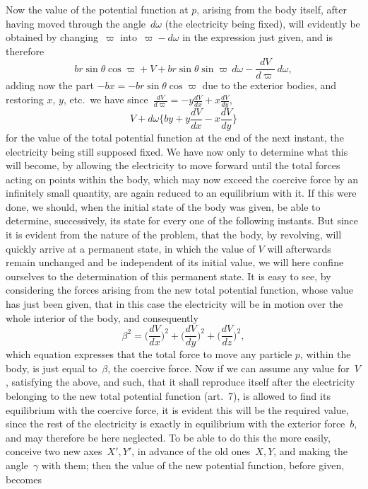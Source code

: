 \documentclass[11pt,notitlepage]{amsart}
\begin{document}
Now the value of the potential function at $p$, arising from the body
itself, after having moved through the angle~$d\omega$
(the electricity being fixed),
will evidently be obtained by changing~$\varpi$
into~$\varpi-d\omega$ in the expression just
given, and is therefore
\[
br\sin\theta\cos\varpi+V+br\sin\theta\sin\varpi\,d\omega
-\frac{dV}{d\varpi}\,d\omega,
\]
adding now the part $-bx=-br\sin\theta\cos\varpi$
due to the exterior bodies, and
restoring $x$, $y$, etc.\ we have
since~$\frac{dV}{d\varpi}=-y\frac{dV}{dx}+x\frac{dV}{dy}$,
\[
V+d\omega\biggl\{
  by+y\frac{dV}{dx}-x\frac{dV}{dy}
\biggr\}
\]
for the value of the total potential function at the end of the next instant,
the electricity being still supposed fixed. We have now only to determine
what this will become, by allowing the electricity to move forward until the
total forces acting on points within the body, which may now exceed the
coercive force by an infinitely small quantity, are again reduced to an 
equilibrium with it. If this were done, we should, when the initial state of the
body was given, be able to determine, successively, its state for every one of
the following instants. But since it is evident from the nature of the problem,
that the body, by revolving, will quickly arrive at a permanent state, in
which the value of $V$ will afterwards remain unchanged and be independent
of its initial value,
we will here confine ourselves to the determination of this
permanent state. It is easy to see, by considering the forces arising from
the new total potential function, whose value has just been given, that in this
case the electricity will be in motion over the whole interior of the body, and
consequently
\[
\beta^2=
\biggl(\frac{dV}{dx}\biggr)^2
+\biggl(\frac{dV}{dy}\biggr)^2
+\biggl(\frac{dV}{dz}\biggr)^2,
\]
which equation expresses that the total force to move any particle $p$, within
the body, is just equal to~$\beta$, the coercive force. Now if we can assume any
value for~$V$, satisfying the above,
and such, that it shall reproduce itself after
the electricity belonging to the new total potential function (art.~7),
is allowed
to find its equilibrium with the coercive force, it is evident this will be the
required value, since the rest of the electricity is exactly in equilibrium with
the exterior force~$b$, and may therefore be here neglected. To be able to
do this the more easily, conceive two new axes~$X',Y'$, in advance of the
old ones~$X,Y$, and making the angle~$\gamma$ with them; then the value of the
new potential function, before given, becomes
\end{document}
